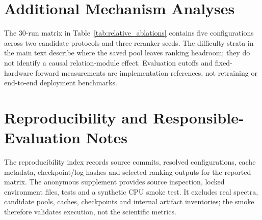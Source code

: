 \documentclass[runningheads]{llncs}
\begin{document}
\section{Additional Mechanism Analyses}

The 30-run matrix in Table~\ref{tab:relative_ablations} contains five
configurations across two candidate protocols and three reranker seeds.
The difficulty strata in the main text describe where the saved pool leaves
ranking headroom; they do not identify a causal relation-module effect.
Evaluation cutoffs and fixed-hardware forward measurements are implementation
references, not retraining or end-to-end deployment benchmarks.

\section{Reproducibility and Responsible-Evaluation Notes}

The reproducibility index records source commits, resolved configurations,
cache metadata, checkpoint/log hashes and selected ranking outputs for the
reported matrix. The anonymous supplement provides source inspection, locked
environment files, tests and a synthetic CPU smoke test. It excludes real
spectra, candidate pools, caches, checkpoints and internal artifact inventories;
the smoke therefore validates execution, not the scientific metrics.



\end{document}
